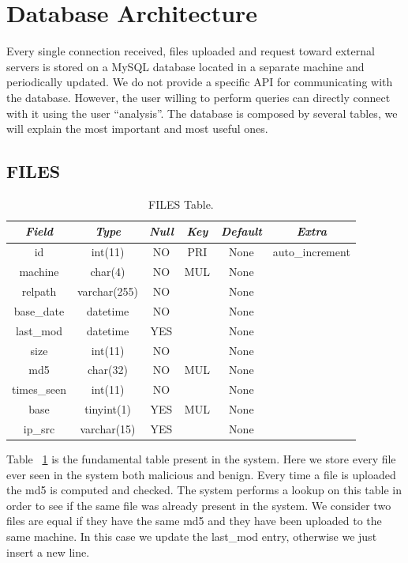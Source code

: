 \section{Database Architecture}

Every single connection received, files uploaded and request toward external servers is stored on a MySQL database located in a separate machine and periodically updated. We do not provide a specific API for communicating with the database. However, the user willing to perform queries can directly connect with it using the user ``analysis''.
The database is composed by several tables, we will explain the most important and most useful ones.

\subsection{FILES}
\begin{table}[H]
\begin{center}
\begin{tabular}{|c|c|c|c|c|c|}
\hline
 \textit{Field} & \textit{Type} & \textit{Null} & \textit{Key} &
 \textit{Default} & \textit{Extra} \\
\hline
id & int(11) & NO & PRI & None & auto\_increment \\
machine & char(4) & NO & MUL & None &  \\
relpath & varchar(255) & NO &  & None &  \\
base\_date & datetime & NO &  & None &  \\
last\_mod & datetime & YES &  & None &  \\
size & int(11) & NO &  & None &  \\
md5 & char(32) & NO & MUL & None &  \\
times\_seen & int(11) & NO &  & None &  \\
base & tinyint(1) & YES & MUL & None &  \\
ip\_src & varchar(15) & YES &  & None &  \\
\hline
\end{tabular}
\caption{FILES Table.\label{tab:FILESCategories}}
\end{center}
\end{table}

Table ~\ref{tab:FILESCategories} is the fundamental table present in the system. Here we store every file ever seen in the system both malicious and benign.
Every time a file is uploaded the md5 is computed and checked. The system performs a lookup on this table in order to see if the same file was already present in the system. We consider two files are equal if they have the same md5 and they have been uploaded to the same machine. In this case we update the last\_mod entry, otherwise we just insert a new line.

